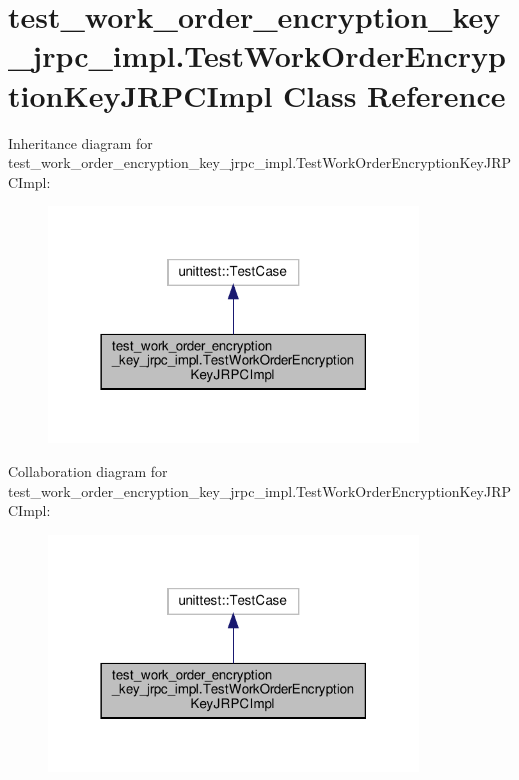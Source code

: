 \hypertarget{classtest__work__order__encryption__key__jrpc__impl_1_1TestWorkOrderEncryptionKeyJRPCImpl}{}\section{test\+\_\+work\+\_\+order\+\_\+encryption\+\_\+key\+\_\+jrpc\+\_\+impl.\+Test\+Work\+Order\+Encryption\+Key\+J\+R\+P\+C\+Impl Class Reference}
\label{classtest__work__order__encryption__key__jrpc__impl_1_1TestWorkOrderEncryptionKeyJRPCImpl}


Inheritance diagram for test\+\_\+work\+\_\+order\+\_\+encryption\+\_\+key\+\_\+jrpc\+\_\+impl.\+Test\+Work\+Order\+Encryption\+Key\+J\+R\+P\+C\+Impl\+:
\nopagebreak
\begin{figure}[H]
\begin{center}
\leavevmode
\includegraphics[width=278pt]{classtest__work__order__encryption__key__jrpc__impl_1_1TestWorkOrderEncryptionKeyJRPCImpl__inherit__graph}
\end{center}
\end{figure}


Collaboration diagram for test\+\_\+work\+\_\+order\+\_\+encryption\+\_\+key\+\_\+jrpc\+\_\+impl.\+Test\+Work\+Order\+Encryption\+Key\+J\+R\+P\+C\+Impl\+:
\nopagebreak
\begin{figure}[H]
\begin{center}
\leavevmode
\includegraphics[width=278pt]{classtest__work__order__encryption__key__jrpc__impl_1_1TestWorkOrderEncryptionKeyJRPCImpl__coll__graph}
\end{center}
\end{figure}
